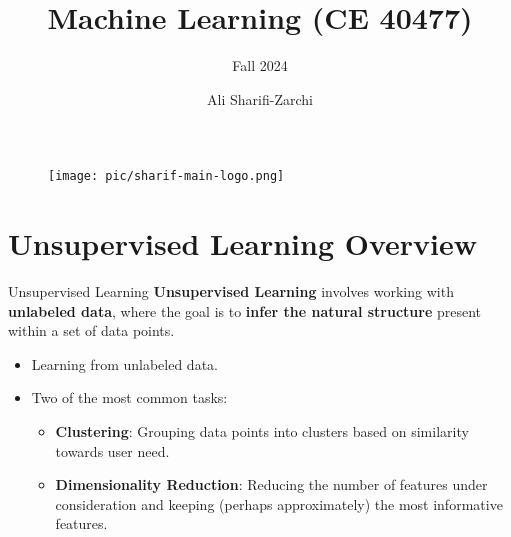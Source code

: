 \documentclass[serif, aspectratio=169]{beamer}
\author{Ali Sharifi-Zarchi}
\title{Machine Learning (CE 40477)}
\subtitle{Fall 2024}
\institute{
    CE Department \\
    Sharif University of Technology
}
\begin{document}
\begin{frame}
    \titlepage
    \vspace*{-0.6cm}
    \begin{figure}[htpb]
        \begin{center}
            \texttt{[image: pic/sharif-main-logo.png]}
        \end{center}
    \end{figure}
\end{frame}

\begin{frame}    
\tableofcontents[sectionstyle=show,
subsectionstyle=show/shaded/hide,
subsubsectionstyle=show/shaded/hide]
\end{frame}

\section{Unsupervised Learning Overview}
\begin{frame}{Unsupervised Learning}
    \textbf{Unsupervised Learning} involves working with \textbf{unlabeled data}, where the goal is to \textbf{infer the natural structure} present within a set of data points.
    \begin{itemize}
        \item Learning from unlabeled data.
        \item Two of the most common tasks:
        \begin{itemize}
            \item \textbf{Clustering}: Grouping data points into clusters based on similarity towards user need.
            \item \textbf{Dimensionality Reduction}: Reducing the number of features under consideration and keeping (perhaps approximately) the most informative features.
        \end{itemize}
    \end{itemize}
\end{frame}
\end{document}
